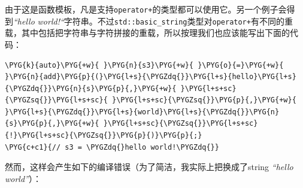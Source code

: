 
由于这是函数模板，凡是支持\texttt{operator+}的类型都可以使用它。另一个例子会得到\textit{“hello} \textit{world!“}字符串。不过\texttt{std::\allowbreak{}basic\_\allowbreak{}string}类型对\texttt{operator+}有不同的重载，其中包括把字符串与字符拼接的重载，所以按理我们也应该能写出下面的代码：



\begin{codeblockbg}
\begin{Verbatim}[commandchars=\\\{\},breaklines=true,breakanywhere=true,fontsize=\codefont,xleftmargin=17bp]
\PYG{k}{auto}\PYG{+w}{ }\PYG{n}{s3}\PYG{+w}{ }\PYG{o}{=}\PYG{+w}{ }\PYG{n}{add}\PYG{p}{(}\PYG{l+s}{\PYGZdq{}}\PYG{l+s}{hello}\PYG{l+s}{\PYGZdq{}}\PYG{n}{s}\PYG{p}{,}\PYG{+w}{ }\PYG{l+s+sc}{\PYGZsq{}}\PYG{l+s+sc}{ }\PYG{l+s+sc}{\PYGZsq{}}\PYG{p}{,}\PYG{+w}{ }\PYG{l+s}{\PYGZdq{}}\PYG{l+s}{world}\PYG{l+s}{\PYGZdq{}}\PYG{n}{s}\PYG{p}{,}\PYG{+w}{ }\PYG{l+s+sc}{\PYGZsq{}}\PYG{l+s+sc}{!}\PYG{l+s+sc}{\PYGZsq{}}\PYG{p}{)}\PYG{p}{;}
\PYG{c+c1}{// s3 = \PYGZdq{}hello world!\PYGZdq{}}
\end{Verbatim}
\end{codeblockbg}



然而，这样会产生如下的编译错误（为了简洁，我实际上把换成了string \textit{“hello world”}）：



